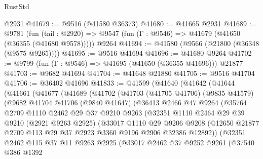 \begin{lexlean}{RustStd}
\begin{coremodule}
    @2931
@41679 := @9516 (@41580 @36373)
@41680 := @41665 @2931
@41689 := @9781
    (fun (tail : @2920) => @9547 (fun (Γ : @9546) => @41679 (@41650 (@36355 (@41680 @9578)))))
    @9264
@41694 := @41580 (@9566 (@21800 (@36348 (@9575 @9265))))
@41695 := @9516 @41694
@41696 := @41680 @9264
@41702 := @9799 (fun (Γ : @9546) => @41695 (@41650 (@36355 @41696))) @21877
@41703 := @9682 @41694
@41704 := @41648 @21880
@41705 := @9516 @41704
@41706 := @36402 @41696
@41833 := @41599
    (@41640
      (@41642
        (@41644
          (@41661
            (@41677
              (@41689
                (@41702
                  (@41703
                    (@41705 @41706)
                    (@9835 @41579)
                    (@9682
                      @41704
                      @41706
                      (@9840 @41647)
                      (@36413
                        @2466
                        @47
                        @9264
                        (@35764
                          @2709
                          @1110
                          @2462
                          @29
                          @37
                          @9210
                          @9263
                          (@32351
                            @1110
                            @2464
                            @29
                            @39
                            @9210
                            (@2921 @9263 @2925)
                            (@33017
                              @1110
                              @29
                              @9206
                              @9208
                              (@12650
                                @21877
                                @2709
                                @113
                                @29
                                @37
                                @2923
                                @3360
                                @9196
                                @2906
                                @32386
                                @12892))
                            (@32351
                              @2462
                              @115
                              @37
                              @11
                              @9263
                              @2925
                              (@33017
                                @2462
                                @37
                                @9252
                                @9261
                                (@37540
                                  @386
                                  @1392

\end{coremodule}
\end{lexlean}
